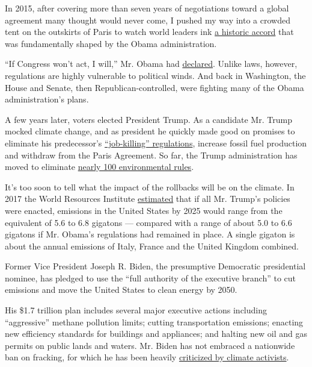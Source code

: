 In 2015, after covering more than seven years of negotiations toward a
global agreement many thought would never come, I pushed my way into a
crowded tent on the outskirts of Paris to watch world leaders ink
\href{https://www.nytimes3xbfgragh.onion/2015/12/13/world/europe/climate-change-accord-paris.html}{a
historic accord} that was fundamentally shaped by the Obama
administration.

``If Congress won't act, I will,'' Mr. Obama had
\href{https://twitter.com/BarackObama/status/366932015439810560?s=20}{declared}.
Unlike laws, however, regulations are highly vulnerable to political
winds. And back in Washington, the House and Senate, then
Republican-controlled, were fighting many of the Obama administration's
plans.

A few years later, voters elected President Trump. As a candidate Mr.
Trump mocked climate change, and as president he quickly made good on
promises to eliminate his predecessor's
\href{https://www.nytimes3xbfgragh.onion/2017/03/28/climate/trump-executive-order-climate-change.html}{``job-killing''
regulations}, increase fossil fuel production and withdraw from the
Paris Agreement. So far, the Trump administration has moved to eliminate
\href{https://www.nytimes3xbfgragh.onion/interactive/2019/climate/trump-environment-rollbacks.html}{nearly
100 environmental rules}.

It's too soon to tell what the impact of the rollbacks will be on the
climate. In 2017 the World Resources Institute
\href{https://www.wri.org/blog/2017/12/insider-climate-effect-trump-administration}{estimated}
that if all Mr. Trump's policies were enacted, emissions in the United
States by 2025 would range from the equivalent of 5.6 to 6.8 gigatons
--- compared with a range of about 5.0 to 6.6 gigatons if Mr. Obama's
regulations had remained in place. A single gigaton is about the annual
emissions of Italy, France and the United Kingdom combined.

Former Vice President Joseph R. Biden, the presumptive Democratic
presidential nominee, has pledged to use the ``full authority of the
executive branch'' to cut emissions and move the United States to clean
energy by 2050.

His \$1.7 trillion plan includes several major executive actions
including ``aggressive'' methane pollution limits; cutting
transportation emissions; enacting new efficiency standards for
buildings and appliances; and halting new oil and gas permits on public
lands and waters. Mr. Biden has not embraced a nationwide ban on
fracking, for which he has been heavily
\href{https://www.nytimes3xbfgragh.onion/2019/10/09/climate/climate-change-biden.html}{criticized
by climate activists}.

